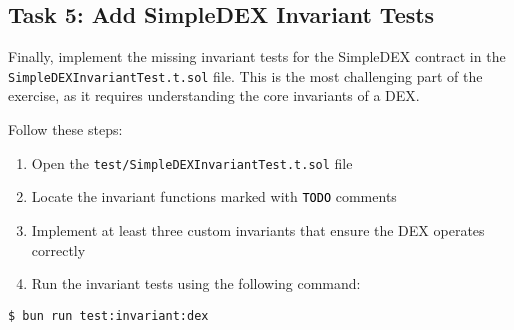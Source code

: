 \documentclass[12pt]{article}
\newcommand{\codegrey}[1]{%
  \texttt{\colorbox{black!4}{\textcolor{black}{#1}}}%
}
\begin{document}
\subsection*{Task 5: Add SimpleDEX Invariant Tests}

Finally, implement the missing invariant tests for the SimpleDEX contract in the \texttt{SimpleDEXInvariantTest.t.sol} file. This is the most challenging part of the exercise, as it requires understanding the core invariants of a DEX.

Follow these steps:
\begin{enumerate}
    \item Open the \texttt{test/SimpleDEXInvariantTest.t.sol} file
    \item Locate the invariant functions marked with \codegrey{TODO} comments
    \item Implement at least three custom invariants that ensure the DEX operates correctly
    \item Run the invariant tests using the following command:
\end{enumerate}

\noindent \begin{minipage}{\textwidth}
\begin{verbatim}
$ bun run test:invariant:dex
\end{verbatim}
\end{minipage}
\end{document}
